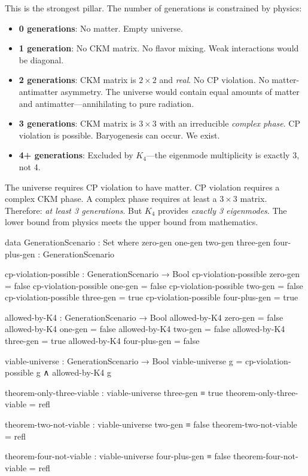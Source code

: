 \documentclass[11pt,a4paper]{book}
\begin{document}
This is the strongest pillar. The number of generations is constrained by physics:

\begin{itemize}
\item \textbf{0 generations}: No matter. Empty universe.
\item \textbf{1 generation}: No CKM matrix. No flavor mixing. Weak interactions would be diagonal.
\item \textbf{2 generations}: CKM matrix is $2 \times 2$ and \emph{real}. No CP violation. No matter-antimatter asymmetry. The universe would contain equal amounts of matter and antimatter---annihilating to pure radiation.
\item \textbf{3 generations}: CKM matrix is $3 \times 3$ with an irreducible \emph{complex phase}. CP violation is possible. Baryogenesis can occur. We exist.
\item \textbf{4+ generations}: Excluded by $K_4$---the eigenmode multiplicity is exactly 3, not 4.
\end{itemize}

The universe requires CP violation to have matter. CP violation requires a complex CKM phase. A complex phase requires at least a $3 \times 3$ matrix. Therefore: \emph{at least 3 generations}. But $K_4$ provides \emph{exactly 3 eigenmodes}. The lower bound from physics meets the upper bound from mathematics.

\begin{code}
data GenerationScenario : Set where
  zero-gen one-gen two-gen three-gen four-plus-gen : GenerationScenario

cp-violation-possible : GenerationScenario → Bool
cp-violation-possible zero-gen      = false
cp-violation-possible one-gen       = false
cp-violation-possible two-gen       = false
cp-violation-possible three-gen     = true
cp-violation-possible four-plus-gen = true

allowed-by-K4 : GenerationScenario → Bool
allowed-by-K4 zero-gen      = false
allowed-by-K4 one-gen       = false
allowed-by-K4 two-gen       = false
allowed-by-K4 three-gen     = true
allowed-by-K4 four-plus-gen = false

viable-universe : GenerationScenario → Bool
viable-universe g = cp-violation-possible g ∧ allowed-by-K4 g

theorem-only-three-viable : viable-universe three-gen ≡ true
theorem-only-three-viable = refl

theorem-two-not-viable : viable-universe two-gen ≡ false
theorem-two-not-viable = refl

theorem-four-not-viable : viable-universe four-plus-gen ≡ false
theorem-four-not-viable = refl
\end{code}
\end{document}
